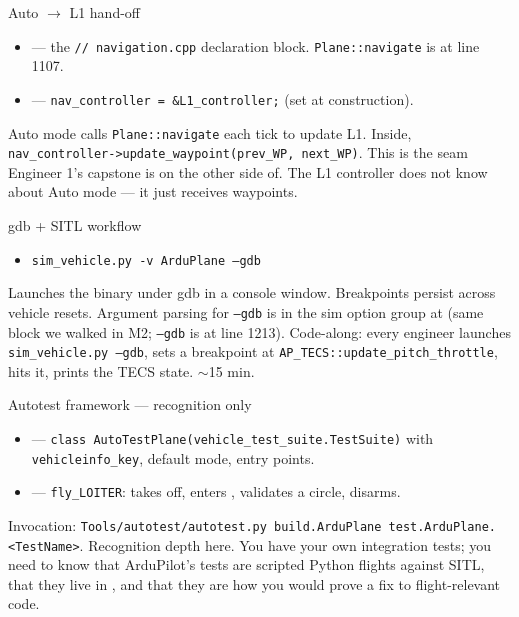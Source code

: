\documentclass[aspectratio=169,11pt]{beamer}
\begin{document}
\begin{frame}{Auto $\rightarrow$ L1 hand-off}
  \begin{itemize}
    \item {} --- the \texttt{// navigation.cpp} declaration block. \texttt{Plane::navigate} is at line 1107.
    \item {} --- \texttt{nav\_controller = \&L1\_controller;} (set at construction).
  \end{itemize}
  \vfill
  Auto mode calls \texttt{Plane::navigate} each tick to update L1. Inside, \texttt{nav\_controller->update\_waypoint(prev\_WP, next\_WP)}.
  \vfill
  This is the seam Engineer 1's capstone is on the other side of. The L1 controller does not know about Auto mode --- it just receives waypoints.
\end{frame}

\begin{frame}[allowframebreaks]{gdb + SITL workflow}
  \begin{itemize}
    \item[\$] \texttt{sim\_vehicle.py -v ArduPlane --gdb}
  \end{itemize}
  Launches the binary under gdb in a console window. Breakpoints persist across vehicle resets.
  \vfill
  Argument parsing for \texttt{--gdb} is in the sim option group at  (same block we walked in M2; \texttt{--gdb} is at line 1213).
  \vfill
  Code-along: every engineer launches \texttt{sim\_vehicle.py --gdb}, sets a breakpoint at \texttt{AP\_TECS::update\_pitch\_throttle}, hits it, prints the TECS state. $\sim$15 min.
\end{frame}

\begin{frame}{Autotest framework --- recognition only}
  \begin{itemize}
    \item {} --- \texttt{class AutoTestPlane(vehicle\_test\_suite.TestSuite)} with \texttt{vehicleinfo\_key}, default mode, entry points.
    \item {} --- \texttt{fly\_LOITER}: takes off, enters , validates a circle, disarms.
  \end{itemize}
  \vfill
  Invocation: \texttt{Tools/autotest/autotest.py build.ArduPlane test.ArduPlane.<TestName>}.
  \vfill
  Recognition depth here. You have your own integration tests; you need to know that ArduPilot's tests are scripted Python flights against SITL, that they live in , and that they are how you would prove a fix to flight-relevant code.
\end{frame}
\end{document}
